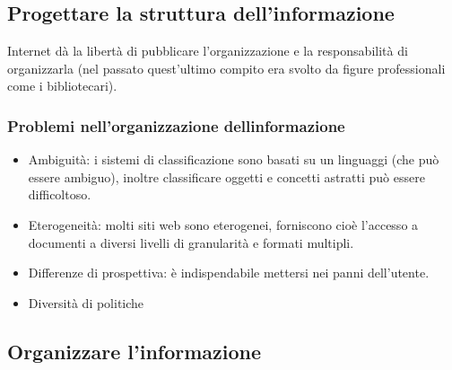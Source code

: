 \documentclass{article}
\begin{document}
\subsection{Progettare la struttura dell'informazione}
Internet dà la libertà di pubblicare l'organizzazione e la responsabilità di organizzarla (nel passato quest'ultimo compito era svolto da figure professionali come i bibliotecari).
\subsubsection{Problemi nell'organizzazione dellinformazione}
\begin{itemize}
	\item Ambiguità: i sistemi di classificazione sono basati su un linguaggi (che può essere ambiguo), inoltre classificare oggetti e concetti astratti può essere difficoltoso.
	\item Eterogeneità: molti siti web sono eterogenei, forniscono cioè l'accesso a documenti a diversi livelli di granularità e formati multipli.
	\item Differenze di prospettiva: è indispendabile mettersi nei panni dell'utente.
	\item Diversità di politiche
\end{itemize}
\subsection{Organizzare l'informazione}
\end{document}

